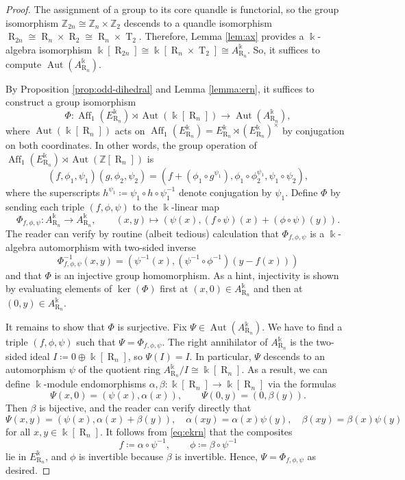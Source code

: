 \documentclass[12 pt]{amsart}
\theoremstyle{definition}
\theoremstyle{remark}
\numberwithin{equation}{section}
\newcommand{\Aut}{\operatorname{Aut}}
\newcommand{\T}{\operatorname{T}}
\newcommand{\R}{\operatorname{R}}
\newcommand{\Aff}{\operatorname{Aff}}
\newcommand{\Z}{\mathbb{Z}}
\newcommand{\inv}{^{-1}}
\renewcommand{\k}{\Bbbk}
\begin{document}
\begin{proof}
    The assignment of a group to its core quandle is functorial, so the group isomorphism $\Z_{2n}\cong\Z_n\times\Z_2$ descends to a quandle isomorphism $\R_{2n}\cong \R_n\times\R_2\cong \R_n\times \T_2$. Therefore, Lemma \ref{lem:ax} provides a $\k$-algebra isomorphism $\k[\R_{2n}]\cong\k[\R_n\times \T_2]\cong A_{\R_n}^\k$. So, it suffices to compute $\Aut(A_{\R_n}^\k)$.

    By Proposition \ref{prop:odd-dihedral} and Lemma \ref{lemma:ern}, it suffices to construct a group isomorphism
    \[
    \Phi\colon \Aff_1(E_{\R_n}^\k)\rtimes\Aut(\k[\R_n])\to\Aut(A_{\R_n}^\k),
    \]
    where $\Aut(\k[\R_n])$ acts on $\Aff_1(E_{\R_n}^\k)=E_{\R_n}^\k\rtimes (E_{\R_n}^\k)^\times$ by conjugation on both coordinates. In other words, the group operation of $\Aff_1(E_{\R_n}^\k)\rtimes\Aut(\Z[\R_n])$ is
    \[
    (f,\phi_1,\psi_1)(g,\phi_2,\psi_2)=(f+(\phi_1\circ g^{\psi_1}),\phi_1\circ \phi_2^{\psi_1},\psi_1\circ\psi_2),
    \]
    where the superscripts $h^{\psi_1}\coloneq\psi_1 \circ h\circ\psi_1\inv$ denote conjugation by $\psi_1$. 
    Define $\Phi$ by sending each triple $(f,\phi,\psi)$ to the $\k$-linear map
    \[
    \Phi_{f,\phi,\psi}\colon A_{\R_n}^\k\to A_{\R_n}^\k,\qquad (x,y)\mapsto(\psi(x),(f\circ\psi)(x)+(\phi\circ\psi)(y)).
    \]
    The reader can verify by routine (albeit tedious) calculation that $\Phi_{f,\phi,\psi}$ is a $\k$-algebra automorphism with two-sided inverse
    \[
    \Phi_{f,\phi,\psi}\inv(x,y)=(\psi\inv(x),(\psi\inv\circ\phi\inv)(y-f(x)))
    \]
    and that $\Phi$ is an injective group homomorphism. As a hint, injectivity is shown by evaluating elements of $\ker(\Phi)$ first at $(x,0)\in A_{\R_n}^\k$ and then at $(0,y)\in A_{\R_n}^\k$.

    It remains to show that $\Phi$ is surjective. Fix $\Psi\in\Aut(A_{\R_n}^\k)$. We have to find a triple $(f,\phi,\psi)$ such that $\Psi=\Phi_{f,\phi,\psi}$. 
    The right annihilator of $A_{\R_n}^\k$ is the two-sided ideal $I\coloneq 0\oplus \k[\R_n]$, so $\Psi(I)=I$. In particular, $\Psi$ descends to an automorphism $\psi$ of the quotient ring $A_{\R_n}^\k/I\cong\k[\R_n]$. As a result, we can define $\k$-module endomorphisms $\alpha,\beta\colon \k[\R_n]\to\k[\R_n]$ via the formulas \[\Psi(x,0)=(\psi(x),\alpha(x)),\qquad\Psi(0,y)=(0,\beta(y)).\] Then 
    $\beta$ is bijective, and the reader can verify directly that \[\Psi(x,y)=(\psi(x),\alpha(x)+\beta(y)),\quad\alpha(xy)=\alpha(x)\psi(y),\quad \beta(xy)=\beta(x)\psi(y)\] for all $x,y\in\k[\R_n]$. It follows from \eqref{eq:ekrn} that the composites
    \[
    f\coloneq \alpha\circ\psi\inv,\qquad \phi\coloneq \beta\circ\psi\inv
    \]
    lie in $E_{\R_n}^\k$, and $\phi$ is invertible because $\beta$ is invertible. 
    Hence, $\Psi=\Phi_{f,\phi,\psi}$ as desired.
\end{proof}
\end{document}
